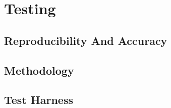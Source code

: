\section{Testing}
  \subsection{Reproducibility And Accuracy}
  \subsection{Methodology}
  \subsection{Test Harness}
